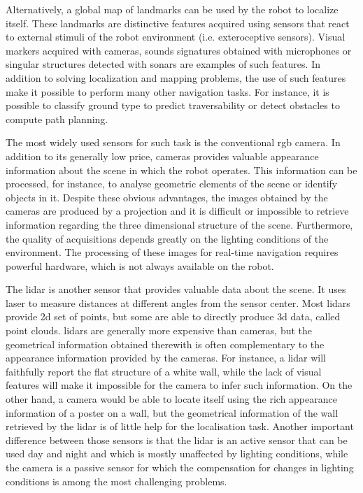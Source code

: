 Alternatively, a global map of landmarks can be used by the robot to localize itself. These landmarks are distinctive features acquired using sensors that react to external stimuli of the robot environment (i.e. exteroceptive sensors). Visual markers acquired with cameras, sounds signatures obtained with microphones or singular structures detected with sonars are examples of such features. In addition to solving localization and mapping problems, the use of such features make it possible to perform many other navigation tasks. For instance, it is possible to classify ground type to predict traversability or detect obstacles to compute path planning.

The most widely used sensors for such task is the conventional \gls*{rgb} camera. In addition to its generally low price, cameras provides valuable appearance information about the scene in which the robot operates. This information can be processed, for instance, to analyse geometric elements of the scene or identify objects in it. Despite these obvious advantages, the images obtained by the cameras are produced by a projection and it is difficult or impossible to retrieve information regarding the three dimensional structure of the scene. Furthermore, the quality of acquisitions depends greatly on the lighting conditions of the environment. The processing of these images for real-time navigation requires powerful hardware, which is not always available on the robot.

The \gls*{lidar} is another sensor that provides valuable data about the scene. It uses laser to measure distances at different angles from the sensor center. Most \gls*{lidar}s provide \gls*{2d} set of points, but some are able to directly produce \gls*{3d} data, called point clouds. \gls*{lidar}s are generally more expensive than cameras, but the geometrical information obtained therewith is often complementary to the appearance information provided by the cameras. For instance, a \gls*{lidar} will faithfully report the flat structure of a white wall, while the lack of visual features will make it impossible for the camera to infer such information. On the other hand, a camera would be able to locate itself using the rich appearance information of a poster on a wall, but the geometrical information of the wall retrieved by the \gls*{lidar} is of little help for the localisation task. Another important difference between those sensors is that the \gls*{lidar} is an active sensor that can be used day and night and which is mostly unaffected by lighting conditions, while the camera is a passive sensor for which the compensation for changes in lighting conditions is among the most challenging problems. 


